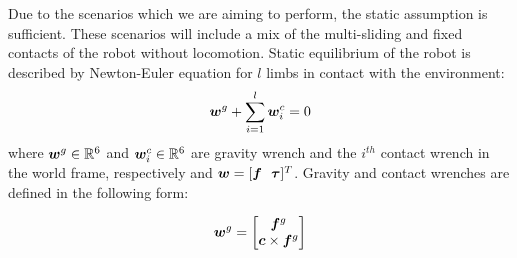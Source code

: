 \documentclass[letterpaper, 10pt, conference]{ieeeconf}
\begin{document}
Due to the scenarios which we are aiming to perform, the static assumption is sufficient. These scenarios will include a mix of the multi-sliding and fixed contacts of the robot without locomotion.
Static equilibrium of the robot is described by Newton-Euler equation for $l$ limbs in contact with the environment:
\begin{equation}
\bm{w}^g + \sum_{i=1}^l {\bm{w}_{i}^c} = 0 \label{NE}
\end{equation}
where $\bm{w}^g\in \mathbb{R}^6$ and $\bm{w}_{i}^c \in \mathbb{R}^6$ are gravity wrench and the $i^{th}$ contact wrench in the world frame, respectively and $ \bm{w} = [\bm{f} \ \ \boldsymbol{\tau} ]^T$. Gravity and contact wrenches are defined in the following form:
\begin{comment}

\begin{equation}
\bfw^g=\begin{bmatrix}
0 & 0 & 0\\0 & 0 & 0\\0 & 0 & 0\\
0 & -mg & 0\\
mg & 0 & 0\\
0 & 0 & 0
\end{bmatrix} \bfp_G+\begin{bmatrix}
0\\0\\-mg\\0\\0\\0
\end{bmatrix} \label{GravityWrench}
\end{equation}

\begin{equation}
\bfW_{i} = \begin{bmatrix}
& & & \\ & I_{3\times 3} & & 0_{3\times 3}\\ & & & \\ 0 & -p_{z,i} & p_{y,i} &\\p_{z,i} & 0 & -p_{x,i} & I_{3\times 3}\\-p_{y,i} & 0 & p_{x,i} &\\
\end{bmatrix}\calW_{i} \label{ContactWrenches}
\end{equation}
where 
\begin{equation}
\calW_{i} = [\bfR_i]_{6\times6} \bfw_i 
\end{equation}

\end{comment}
\begin{equation}
\bm{w}^g=\begin{bmatrix}
\bm{f}^g \\ \bm{c} \times \bm{f}^g
\end{bmatrix}
\label{GravityWrench}
\end{equation}
\end{document}

